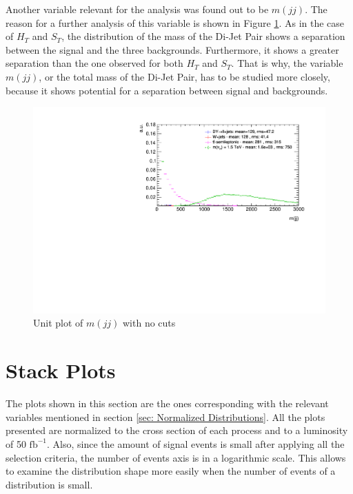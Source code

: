 Another variable relevant for the analysis was found out to be $m(jj)$. The reason for a further analysis of this variable is shown in Figure \ref{fig: mjjUnitNC}. As in the case of $H_{T}$ and $S_{T}$, the distribution of the mass of the Di-Jet Pair shows a separation between the signal and the three backgrounds. Furthermore, it shows a greater separation than the one observed for both $H_{T}$ and $S_{T}$. That is why, the variable $m(jj)$, or the total mass of the Di-Jet Pair, has to be studied more closely, because it shows potential for a separation between signal and backgrounds.

\begin{figure}
\centering
\includegraphics[width=\linewidth]{Plots/mjj_unitNC.pdf}
\caption{Unit plot of $m(jj)$ with no cuts}
\label{fig: mjjUnitNC}
\end{figure}


\section{Stack Plots}\label{section: stackPlots}

The plots shown in this section are the ones corresponding with the relevant variables mentioned in section \ref{sec: Normalized Distributions}. All the plots presented are normalized to the cross section of each process and to a luminosity of 50 $\text{fb}^{-1}$. Also, since the amount of signal events is small after applying all the selection criteria, the number of events axis is in a logarithmic scale. This allows to examine the distribution shape more easily when the number of events of a distribution is small. 

